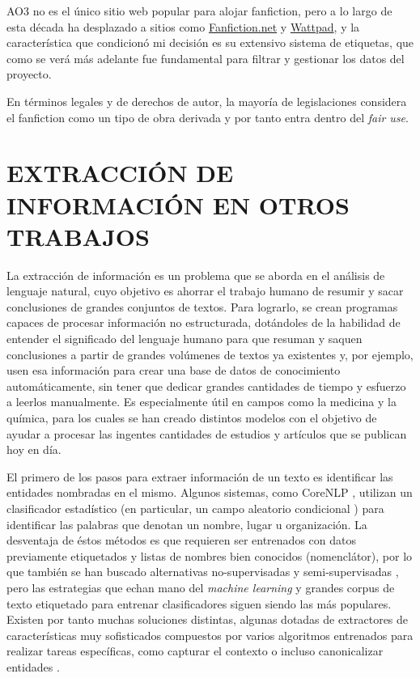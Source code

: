 \documentclass{pre-tfg}
\begin{document}
AO3 no es el único sitio web popular para alojar fanfiction, pero a lo largo de esta década ha desplazado a sitios como \href{http://fanfiction.net}{Fanfiction.net} y \href{https://www.wattpad.com/}{Wattpad}, y la característica que condicionó mi decisión es su extensivo sistema de etiquetas, que como se verá más adelante fue fundamental para filtrar y gestionar los datos del proyecto.

En términos legales y de derechos de autor, la mayoría de legislaciones considera el fanfiction como un tipo de obra derivada  \cite{woosh_1998} y por tanto entra dentro del \textit{fair use}.


\cleardoublepage
\section{EXTRACCIÓN DE INFORMACIÓN EN OTROS TRABAJOS}

La extracción de información es un problema que se aborda en el análisis de lenguaje natural, cuyo objetivo es ahorrar el trabajo humano de resumir y sacar conclusiones de grandes conjuntos de textos. Para lograrlo, se crean programas capaces de procesar información no estructurada, dotándoles de la habilidad de entender el significado del lenguaje humano para que resuman y saquen conclusiones a partir de grandes volúmenes de textos ya existentes y, por ejemplo, usen esa información para crear una base de datos de conocimiento automáticamente, sin tener que dedicar grandes cantidades de tiempo y esfuerzo a leerlos manualmente. Es especialmente útil en campos como la medicina y la química, para los cuales se han creado distintos modelos \cite{craven_99}\cite{manica_2019} con el objetivo de ayudar a procesar las ingentes cantidades de estudios y artículos que se publican hoy en día.


El primero de los pasos para extraer información de un texto es identificar las entidades nombradas en el mismo. Algunos sistemas, como CoreNLP \cite{corenlp_ner}, utilizan un clasificador estadístico (en particular, un campo aleatorio condicional \cite{laff_2001}) para identificar las palabras que denotan un nombre, lugar u organización. La desventaja de éstos métodos es que requieren ser entrenados con datos previamente etiquetados y listas de nombres bien conocidos (nomenclátor), por lo que también se han buscado alternativas no-supervisadas \cite{nothman_2013} y semi-supervisadas \cite{lin_2009}, pero las estrategias que echan mano del \textit{machine learning} y grandes corpus de texto etiquetado para entrenar clasificadores siguen siendo las más populares. Existen por tanto muchas soluciones distintas, algunas dotadas de extractores de características muy sofisticados compuestos por varios algoritmos entrenados para realizar tareas específicas, como capturar el contexto o incluso canonicalizar entidades \cite{wick_2009}.
\end{document}
